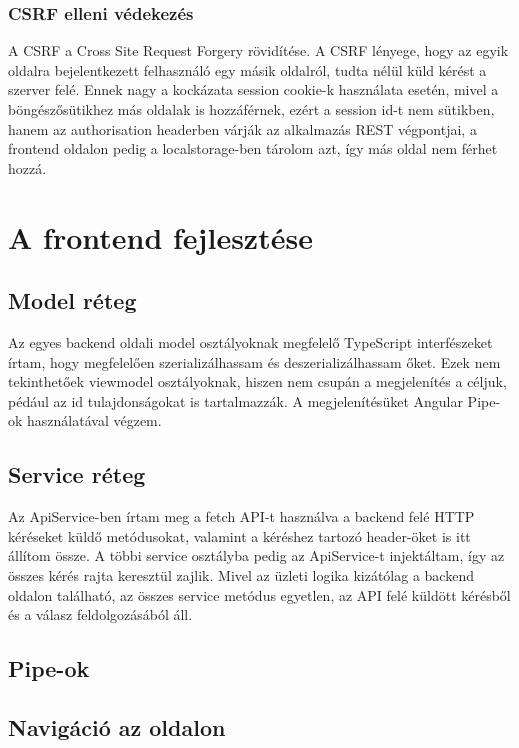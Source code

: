 \documentclass[a4paper,12pt]{report}
\theoremstyle{definition}
\theoremstyle{remark}
\begin{document}
	\subsection{CSRF elleni védekezés}

A CSRF a Cross Site Request Forgery rövidítése. A CSRF lényege, hogy az egyik oldalra bejelentkezett felhasználó egy másik oldalról, tudta nélül küld kérést a szerver felé. Ennek nagy a kockázata session cookie-k használata esetén, mivel a böngészősütikhez más oldalak is hozzáférnek, ezért a session id-t nem sütikben, hanem az authorisation headerben várják az alkalmazás REST végpontjai, a frontend oldalon pedig a localstorage-ben tárolom azt, így más oldal nem férhet hozzá.

\chapter{A frontend fejlesztése}

\section{Model réteg}

Az egyes backend oldali model osztályoknak megfelelő TypeScript interfészeket írtam, hogy megfelelően szerializálhassam és deszerializálhassam őket. Ezek nem tekinthetőek viewmodel osztályoknak, hiszen nem csupán a megjelenítés a céljuk, pédául az id tulajdonságokat is tartalmazzák. A megjelenítésüket Angular Pipe-ok használatával végzem.

\section{Service réteg}

Az ApiService-ben írtam meg a fetch API-t használva a backend felé HTTP kéréseket küldő metódusokat, valamint a kéréshez tartozó header-öket is itt állítom össze. A többi service osztályba pedig az ApiService-t injektáltam, így az összes kérés rajta keresztül zajlik.  Mivel az üzleti logika kizátólag a backend oldalon található, az összes service metódus egyetlen, az API felé küldött kérésből és a válasz feldolgozásából áll.

\section{Pipe-ok}

\section{Navigáció az oldalon}
\end{document}
